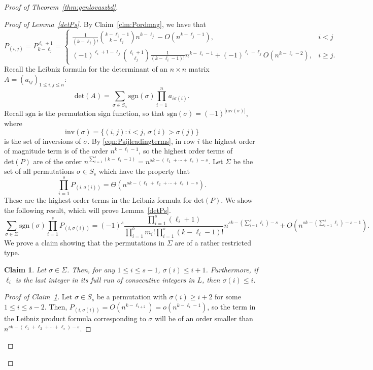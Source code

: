 \documentclass[11pt]{article}
\newtheorem{claim}[theorem]{Claim}
\theoremstyle{definition}
\theoremstyle{remark}
\begin{document}
\begin{proof}[Proof of Theorem~\ref{thm:genlovaszbd}]
\begin{proof}[Proof of Lemma~\ref{detPs}]
By Claim~\ref{clm:Pordmag}, we have that
\begin{equation}\label{eqn:Psijleadingterms}
P_{(i, j)} = P_{k-\ell_j}^{\ell_i+1} = \begin{cases}\frac{1}{(k-\ell_j)!}\binom{k-\ell_i-1}{k-\ell_j}n^{k-\ell_j} - O(n^{k-\ell_j-1}),& i < j \\ (-1)^{\ell_i+1-\ell_j}\binom{\ell_i+1}{\ell_j}\frac{1}{(k-\ell_i-1)!}n^{k-\ell_i-1} + (-1)^{\ell_i-\ell_j}O(n^{k-\ell_i-2}), & i \ge j.\end{cases}
\end{equation}
Recall the Leibniz formula for the determinant of an $n\times n$ matrix $A=(a_{ij})_{1\le i, j\le n}$:
\[\text{det}(A) = \sum_{\sigma\in S_n}\text{sgn}(\sigma)\prod_{i=1}^na_{i\sigma(i)}.\]
Recall $\text{sgn}$ is the permutation sign function, so that $\text{sgn}(\sigma) = (-1)^{|\text{inv}(\sigma)|}$, where \[\text{inv}(\sigma) = \{(i, j): i < j,\, \sigma(i) > \sigma(j)\}\] is the set of inversions of $\sigma$. By \eqref{eqn:Psijleadingterms}, in row $i$ the highest order of magnitude term is of the order $n^{k-\ell_{i}-1}$, so the highest order terms of $\text{det}(P)$ are of the order $n^{\sum_{i=1}^s(k-\ell_i-1) } = n^{sk-(\ell_1+\cdots+\ell_s)-s}$. Let $\Sigma$ be the set of all permutations $\sigma \in S_s$ which have the property that \[\prod_{i=1}^sP_{(i,\sigma(i))} = \Theta(n^{sk-(\ell_1+\ell_2+\cdots+\ell_s)-s}).\] These are the highest order terms in the Leibniz formula for $\text{det}(P)$. We show the following result, which will prove Lemma~\ref{detPs}.
\begin{equation}\label{detPshighestorder}
\sum_{\sigma\in\Sigma}\text{sgn}(\sigma)\prod_{i=1}^sP_{(i,\sigma(i))}=(-1)^s\frac{\prod_{i=1}^s(\ell_i+1)}{ \prod_{i=1}^bm_i!  \prod_{i=1}^s(k-\ell_i-1)!}n^{sk-(\sum_{i=1}^s\ell_i)-s} + O(n^{sk-(\sum_{i=1}^s\ell_i)-s-1}).
\end{equation}
We prove a claim showing that the permutations in $\Sigma$ are of a rather restricted type. 
\begin{claim}\label{clm:Sigmarestrict}
Let $\sigma\in \Sigma$. Then, for any $1\le i\le s-1$, $\sigma(i) \le i+1$. Furthermore, if $\ell_i$ is the last integer in its full run of consecutive integers in $L$, then $\sigma(i) \le i$.
\end{claim}
\begin{proof}[Proof of Claim~\ref{clm:Sigmarestrict}]
Let $\sigma \in S_s$ be a permutation with $\sigma(i) \ge i+2$ for some $1\le i\le s-2$. Then, $P_{(i,\sigma(i))} = O(n^{k-\ell_{i+2}}) = o(n^{k-\ell_i-1})$, so the term in the Leibniz product formula corresponding to $\sigma$ will be of an order smaller than $n^{sk-(\ell_1+\ell_2+\cdots+\ell_s)-s}$. 


\end{proof}
\end{proof}
\end{proof}
\end{document}
